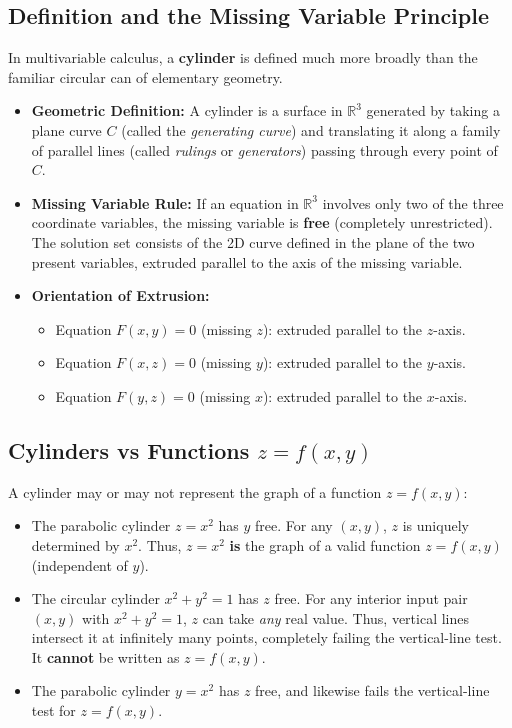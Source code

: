 \documentclass[11pt,letterpaper]{article}
\newcommand{\R}{\mathbb{R}}
\begin{document}
\subsection{Definition and the Missing Variable Principle}
In multivariable calculus, a \textbf{cylinder} is defined much more broadly than the familiar circular can of elementary geometry.
\begin{itemize}[leftmargin=*]
    \item \textbf{Geometric Definition:} A cylinder is a surface in $\R^3$ generated by taking a plane curve $C$ (called the \emph{generating curve}) and translating it along a family of parallel lines (called \emph{rulings} or \emph{generators}) passing through every point of $C$.
    \item \textbf{Missing Variable Rule:} If an equation in $\R^3$ involves only two of the three coordinate variables, the missing variable is \textbf{free} (completely unrestricted). The solution set consists of the 2D curve defined in the plane of the two present variables, extruded parallel to the axis of the missing variable.
    \item \textbf{Orientation of Extrusion:}
    \begin{itemize}[nosep]
        \item Equation $F(x,y) = 0$ (missing $z$): extruded parallel to the $z$-axis.
        \item Equation $F(x,z) = 0$ (missing $y$): extruded parallel to the $y$-axis.
        \item Equation $F(y,z) = 0$ (missing $x$): extruded parallel to the $x$-axis.
    \end{itemize}
\end{itemize}

\subsection{Cylinders vs Functions $z=f(x,y)$}
A cylinder may or may not represent the graph of a function $z = f(x,y)$:
\begin{itemize}[leftmargin=*,nosep]
    \item The parabolic cylinder $z = x^2$ has $y$ free. For any $(x,y)$, $z$ is uniquely determined by $x^2$. Thus, $z = x^2$ \textbf{is} the graph of a valid function $z = f(x,y)$ (independent of $y$).
    \item The circular cylinder $x^2 + y^2 = 1$ has $z$ free. For any interior input pair $(x,y)$ with $x^2+y^2=1$, $z$ can take \emph{any} real value. Thus, vertical lines intersect it at infinitely many points, completely failing the vertical-line test. It \textbf{cannot} be written as $z = f(x,y)$.
    \item The parabolic cylinder $y = x^2$ has $z$ free, and likewise fails the vertical-line test for $z=f(x,y)$.
\end{itemize}
\end{document}
